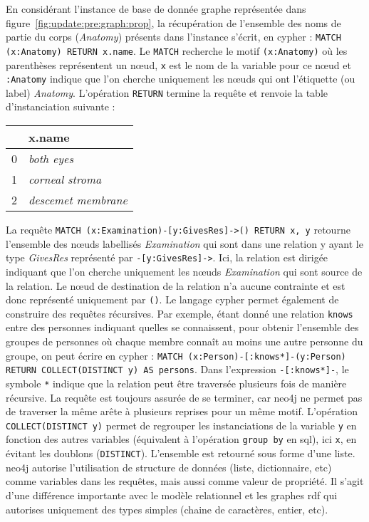 \begin{example}
    En considérant l'instance de base de donnée graphe représentée dans figure~\ref{fig:update:pre:graph:prop}, la récupération de l'ensemble des noms de partie du corps (\emph{Anatomy}) présents dans l'instance s'écrit, en \gls{cypher} : \verb|MATCH (x:Anatomy) RETURN x.name|.
    Le \verb|MATCH| recherche le motif \verb|(x:Anatomy)| où les parenthèses représentent un nœud, \verb|x| est le nom de la variable pour ce nœud et \verb|:Anatomy| indique que l'on cherche uniquement les nœuds qui ont l'étiquette (ou label) \emph{Anatomy}.
    L'opération \verb|RETURN| termine la requête et renvoie la table d'instanciation suivante :

    \begin{center}
        \begin{tabular}{c|l}
              & x.name                   \\
            \hline
            0 & \emph{both eyes}         \\
            1 & \emph{corneal stroma}    \\
            2 & \emph{descemet membrane}
        \end{tabular}
    \end{center}

    La requête \verb|MATCH (x:Examination)-[y:GivesRes]->() RETURN x, y| retourne l'ensemble des nœuds labellisés \emph{Examination} qui sont dans une relation y ayant le type \emph{GivesRes} représenté par \verb|-[y:GivesRes]->|.
    Ici, la relation est dirigée indiquant que l'on cherche uniquement les nœuds \emph{Examination} qui sont source de la relation.
    Le nœud de destination de la relation n'a aucune contrainte et est donc représenté uniquement par \verb|()|.
    Le langage \gls{cypher} permet également de construire des requêtes récursives.
    Par exemple, étant donné une relation \verb|knows| entre des personnes indiquant quelles se connaissent, pour obtenir l'ensemble des groupes de personnes où chaque membre connaît au moins une autre personne du groupe, on peut écrire en \gls{cypher} : \verb|MATCH (x:Person)-[:knows*]-(y:Person) RETURN COLLECT(DISTINCT y) AS persons|.
    Dans l'expression \verb|-[:knows*]-|, le symbole \verb|*| indique que la relation peut être traversée plusieurs fois de manière récursive.
    La requête est toujours assurée de se terminer, car \gls{neo4j} ne permet pas de traverser la même arête à plusieurs reprises pour un même motif.
    L'opération \verb|COLLECT(DISTINCT y)| permet de regrouper les instanciations de la variable \verb|y| en fonction des autres variables (équivalent à l'opération \verb|group by| en \gls{sql}), ici \verb|x|, en évitant les doublons (\verb|DISTINCT|).
    L'ensemble est retourné sous forme d'une liste.
    \gls{neo4j} autorise l'utilisation de structure de données (liste, dictionnaire, etc) comme variables dans les requêtes, mais aussi comme valeur de propriété.
    Il s'agit d'une différence importante avec le modèle relationnel et les graphes \gls{rdf} qui autorises uniquement des types simples (chaine de caractères, entier, etc).
\end{example}
